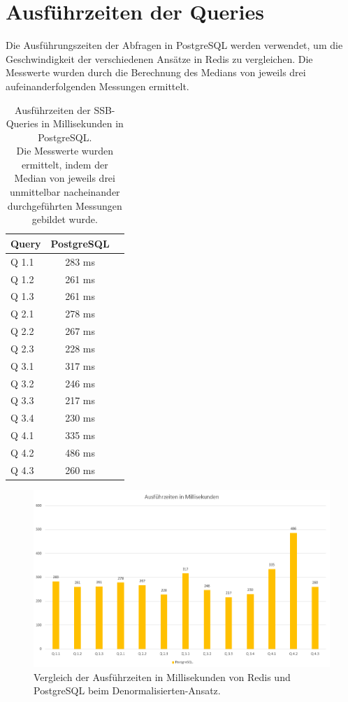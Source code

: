 \section{Ausführzeiten der Queries} %
Die Ausführungszeiten der Abfragen in PostgreSQL werden verwendet, um die Geschwindigkeit der verschiedenen Ansätze in Redis zu vergleichen. Die Messwerte wurden durch die Berechnung des Medians von jeweils drei aufeinanderfolgenden Messungen ermittelt.
\begin{table}[h]
\centering
\begin{tabular}{lcc}
\hline
Query & PostgreSQL \\ \hline
Q 1.1 & 283 ms       \\
Q 1.2 & 261 ms       \\
Q 1.3 & 261 ms       \\
Q 2.1 & 278 ms       \\
Q 2.2 & 267 ms       \\
Q 2.3 & 228 ms       \\
Q 3.1 & 317 ms       \\
Q 3.2 & 246 ms       \\
Q 3.3 & 217 ms       \\
Q 3.4 & 230 ms       \\
Q 4.1 & 335 ms       \\
Q 4.2 & 486 ms       \\
Q 4.3 & 260 ms       \\ \hline
\end{tabular}
\caption{Ausführzeiten der SSB-Queries in Millisekunden in PostgreSQL.\\
Die Messwerte wurden ermittelt, indem der Median von jeweils drei unmittelbar nacheinander durchgeführten Messungen gebildet wurde.}
\label{tab:results-postgres}
\end{table}



\begin{figure}[ht]  %
    \centering      %
    \includegraphics[width=1\textwidth]{pictures/results/results-postgres.png}
    \caption{Vergleich der Ausführzeiten in Millisekunden von Redis und PostgreSQL beim Denormalisierten-Ansatz.}      %
    \label{pic:results-denormalized}    %
\end{figure}